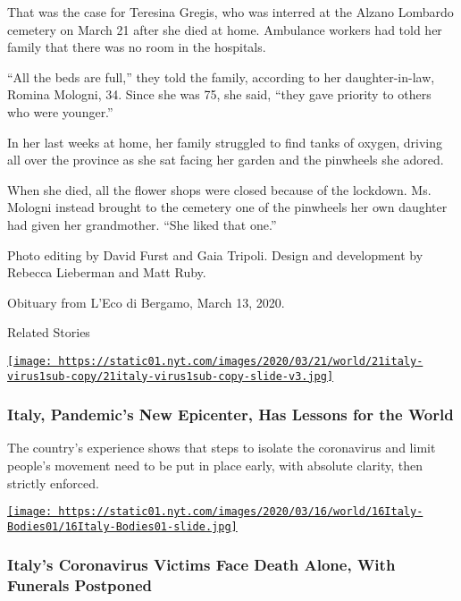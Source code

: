 That was the case for Teresina Gregis, who was interred at the Alzano
Lombardo cemetery on March 21 after she died at home. Ambulance workers
had told her family that there was no room in the hospitals.

``All the beds are full,'' they told the family, according to her
daughter-in-law, Romina Mologni, 34. Since she was 75, she said, ``they
gave priority to others who were younger.''

In her last weeks at home, her family struggled to find tanks of oxygen,
driving all over the province as she sat facing her garden and the
pinwheels she adored.

When she died, all the flower shops were closed because of the lockdown.
Ms. Mologni instead brought to the cemetery one of the pinwheels her own
daughter had given her grandmother. ``She liked that one.''

Photo editing by David Furst and Gaia Tripoli. Design and development by
Rebecca Lieberman and Matt Ruby.

Obituary from L'Eco di Bergamo, March 13, 2020.

Related Stories

\href{https://www.nytimes.com/2020/03/21/world/europe/italy-coronavirus-center-lessons.html}{\texttt{[image: https://static01.nyt.com/images/2020/03/21/world/21italy-virus1sub-copy/21italy-virus1sub-copy-slide-v3.jpg]}}

\hypertarget{italy-pandemics-new-epicenter-has-lessons-for-the-world}{%
\subsubsection{Italy, Pandemic's New Epicenter, Has Lessons for the
World}\label{italy-pandemics-new-epicenter-has-lessons-for-the-world}}

The country's experience shows that steps to isolate the coronavirus and
limit people's movement need to be put in place early, with absolute
clarity, then strictly enforced.

\href{https://www.nytimes.com/2020/03/16/world/europe/italy-coronavirus-funerals.html}{\texttt{[image: https://static01.nyt.com/images/2020/03/16/world/16Italy-Bodies01/16Italy-Bodies01-slide.jpg]}}

\hypertarget{italys-coronavirus-victims-face-death-alone-with-funerals-postponed}{%
\subsubsection{Italy's Coronavirus Victims Face Death Alone, With
Funerals
Postponed}\label{italys-coronavirus-victims-face-death-alone-with-funerals-postponed}}

